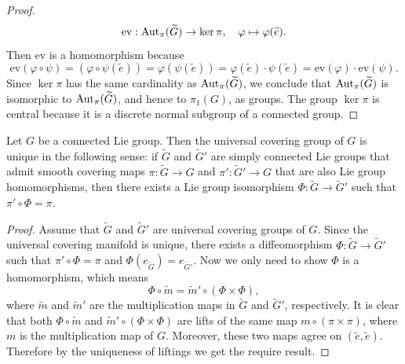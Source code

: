 \begin{proof}
\[\mathrm{ev}:\mathrm{Aut}_{\pi}(\widetilde{G})\to\ker\pi,\quad \varphi\mapsto\varphi(\widetilde{e}).\]
Then $\mathrm{ev}$ is a homomorphism because
\[\mathrm{ev}(\varphi\circ\psi)=(\varphi\circ\psi(\widetilde{e}))=\varphi(\psi(\widetilde{e}))=\varphi(\widetilde{e})\cdot\psi(\widetilde{e})=\mathrm{ev}(\varphi)\cdot\mathrm{ev}(\psi).\]
Since $\ker\pi$ has the same cardinality as $\mathrm{Aut}_{\pi}(\widetilde{G})$, we conclude that $\mathrm{Aut}_{\pi}(\widetilde{G})$ is isomorphic to $\mathrm{Aut}_{\pi}(\widetilde{G})$, and hence to $\pi_1(G)$, as groups. The group $\ker\pi$ is central because it is a discrete normal subgroup of a connected group. 
\end{proof}
\begin{theorem}
Let $G$ be a connected Lie group. Then the universal covering group of $G$ is unique in the following sense: if $\widetilde{G}$ and $\widetilde{G}'$ are simply connected Lie groups that admit smooth covering maps $\pi:\widetilde{G}\to G$ and $\pi':\widetilde{G}'\to G$ that are also Lie group homomorphisms, then there exists a Lie group isomorphism $\varPhi:\widetilde{G}\to\widetilde{G}'$ such that $\pi'\circ\varPhi=\pi$.
\end{theorem}
\begin{proof}
Assume that $\widetilde{G}$ and $\widetilde{G}'$ are universal covering groups of $G$. Since the universal covering manifold is unique, there exists a diffeomorphism $\varPhi:\widetilde{G}\to\widetilde{G}'$ such that $\pi'\circ\varPhi=\pi$ and $\varPhi(e_{\widetilde{G}})=e_{\widetilde{G}'}$. Now we only need to show $\varPhi$ is a homomorphism, which means \[\varPhi\circ\widetilde{m}=\widetilde{m}'\circ(\varPhi\times\varPhi),\]
where $\widetilde{m}$ and $\widetilde{m}'$ are the multiplication maps in $\widetilde{G}$ and $\widetilde{G}'$, respectively. It is clear that both $\varPhi\circ\widetilde{m}$ and $\widetilde{m}'\circ(\varPhi\times\varPhi)$ are lifts of the same map $m\circ(\pi\times\pi)$, where $m$ is the multiplication map of $G$. Moreover, these two maps agree on $(\widetilde{e},\widetilde{e})$. Therefore by the uniqueness of liftings we get the require result.
\end{proof}
